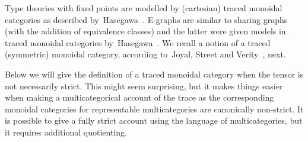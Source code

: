 Type theories with fixed points are modelled by (cartesian) traced monoidal categories as described by~Hasegawa~\cite{hasegawa_models_1999}.
E-graphs are similar to sharing graphs (with the addition of equivalence classes) and the latter were given models in traced monoidal categories by~Hasegawa~\cite{hasegawa_models_1999}.
We recall a notion of a traced (symmetric) monoidal category, according to~Joyal, Street and Verity~\cite{Joyal_Street_Verity_1996}, next.

\begin{remark}
  Below we will give the definition of a traced monoidal category when the tensor is not necessarily strict.
  This might seem surprising, but it makes things easier when making a multicategorical account of the trace as the corresponding monoidal categories for representable multicategories are canonically non-strict.
  It is possible to give a fully strict account using the language of multicategories, but it requires additional quotienting.
\end{remark}

